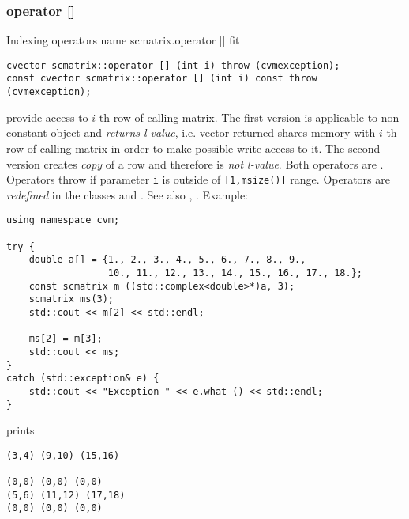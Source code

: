 \subsubsection{operator []}
Indexing operators%
\pdfdest name {scmatrix.operator []} fit
\begin{verbatim}
cvector scmatrix::operator [] (int i) throw (cvmexception);
const cvector scmatrix::operator [] (int i) const throw (cvmexception);
\end{verbatim}
provide access to \hbox{$i$-th} row of calling matrix. The first version
is applicable to  non-constant object and
\emph{returns  l-value}, i.e.  vector returned shares  memory
with  \hbox{$i$-th} row of calling matrix
in order to make possible write access to it.
The second version creates  \emph{copy} of a row and therefore is
\emph{not  l-value}.
Both operators are \Based.
Operators throw 
if  parameter \verb"i" is outside of \verb"[1,msize()]" range.
Operators are \emph{redefined}
in  the classes 
and .
See also ,
.
Example:
\begin{Verbatim}
using namespace cvm;

try {
    double a[] = {1., 2., 3., 4., 5., 6., 7., 8., 9.,
                  10., 11., 12., 13., 14., 15., 16., 17., 18.};
    const scmatrix m ((std::complex<double>*)a, 3);
    scmatrix ms(3);
    std::cout << m[2] << std::endl;

    ms[2] = m[3];
    std::cout << ms;
}
catch (std::exception& e) {
    std::cout << "Exception " << e.what () << std::endl;
}
\end{Verbatim}
prints
\begin{Verbatim}
(3,4) (9,10) (15,16)

(0,0) (0,0) (0,0)
(5,6) (11,12) (17,18)
(0,0) (0,0) (0,0)
\end{Verbatim}
\newpage



